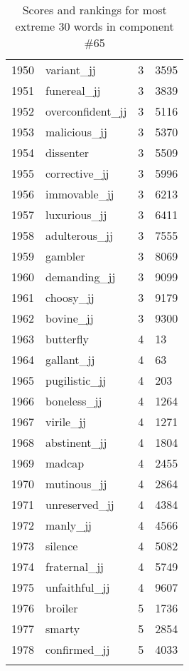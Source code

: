 \begin{longtable}[!htbp]{| rlr@{.}l |}
    1950 & variant\_jj & 3 & 3595 \\
    1951 & funereal\_jj & 3 & 3839 \\
    1952 & overconfident\_jj & 3 & 5116 \\
    1953 & malicious\_jj & 3 & 5370 \\
    1954 & dissenter & 3 & 5509 \\
    1955 & corrective\_jj & 3 & 5996 \\
    1956 & immovable\_jj & 3 & 6213 \\
    1957 & luxurious\_jj & 3 & 6411 \\
    1958 & adulterous\_jj & 3 & 7555 \\
    1959 & gambler & 3 & 8069 \\
    1960 & demanding\_jj & 3 & 9099 \\
    1961 & choosy\_jj & 3 & 9179 \\
    1962 & bovine\_jj & 3 & 9300 \\
    1963 & butterfly & 4 & 13 \\
    1964 & gallant\_jj & 4 & 63 \\
    1965 & pugilistic\_jj & 4 & 203 \\
    1966 & boneless\_jj & 4 & 1264 \\
    1967 & virile\_jj & 4 & 1271 \\
    1968 & abstinent\_jj & 4 & 1804 \\
    1969 & madcap & 4 & 2455 \\
    1970 & mutinous\_jj & 4 & 2864 \\
    1971 & unreserved\_jj & 4 & 4384 \\
    1972 & manly\_jj & 4 & 4566 \\
    1973 & silence & 4 & 5082 \\
    1974 & fraternal\_jj & 4 & 5749 \\
    1975 & unfaithful\_jj & 4 & 9607 \\
    1976 & broiler & 5 & 1736 \\
    1977 & smarty & 5 & 2854 \\
    1978 & confirmed\_jj & 5 & 4033 \\
    \hline
    \caption{Scores and rankings for most extreme 30 words in component \#65} \\
\end{longtable}
